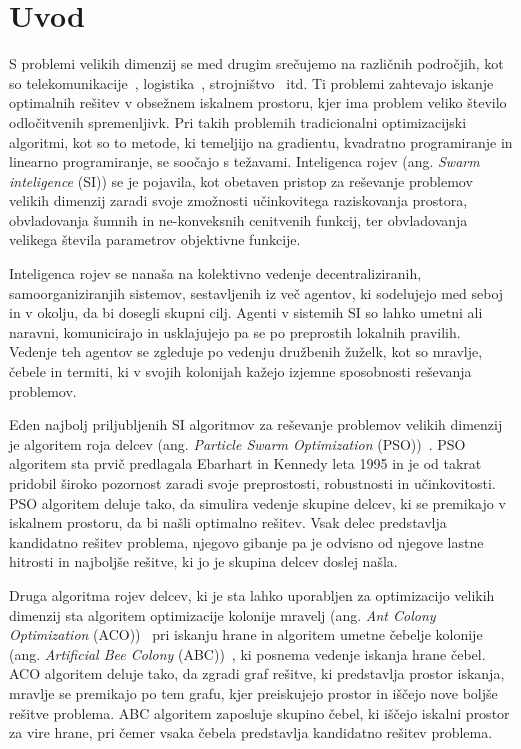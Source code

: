 \chapter{Uvod}\label{cahp:uvod}
S problemi velikih dimenzij se med drugim srečujemo na različnih področjih, kot so telekomunikacije~\cite{bib:lsgo:telecommunication}, logistika~\cite{bib:lsog:logistics}, strojništvo~\cite{bib:lsgo:engineering} itd.
Ti problemi zahtevajo iskanje optimalnih rešitev v obsežnem iskalnem prostoru, kjer ima problem veliko število odločitvenih spremenljivk.
Pri takih problemih tradicionalni optimizacijski algoritmi, kot so to metode, ki temeljijo na gradientu, kvadratno programiranje in linearno programiranje, se soočajo s težavami.
Inteligenca rojev (ang. \textit{Swarm inteligence} (SI)) se je pojavila, kot obetaven pristop za reševanje problemov velikih dimenzij zaradi svoje zmožnosti učinkovitega raziskovanja prostora, obvladovanja šumnih in ne-konveksnih cenitvenih funkcij, ter obvladovanja velikega števila parametrov objektivne funkcije.

Inteligenca rojev se nanaša na kolektivno vedenje decentraliziranih, samoorganiziranjih sistemov, sestavljenih iz več agentov, ki sodelujejo med seboj in v okolju, da bi dosegli skupni cilj.
Agenti v sistemih SI so lahko umetni ali naravni, komunicirajo in usklajujejo pa se po preprostih lokalnih pravilih.
Vedenje teh agentov se zgleduje po vedenju družbenih žuželk, kot so mravlje, čebele in termiti, ki v svojih kolonijah kažejo izjemne sposobnosti reševanja problemov.

Eden najbolj priljubljenih SI algoritmov za reševanje problemov velikih dimenzij je algoritem roja delcev (ang. \textit{Particle Swarm Optimization} (PSO))~\cite{alg:pso}.
PSO algoritem sta prvič predlagala Ebarhart in Kennedy leta 1995 in je od takrat pridobil široko pozornost zaradi svoje preprostosti, robustnosti in učinkovitosti.
PSO algoritem deluje tako, da simulira vedenje skupine delcev, ki se premikajo v iskalnem prostoru, da bi našli optimalno rešitev.
Vsak delec predstavlja kandidatno rešitev problema, njegovo gibanje pa je odvisno od njegove lastne hitrosti in najboljše rešitve, ki jo je skupina delcev doslej našla.

Druga algoritma rojev delcev, ki je sta lahko uporabljen za optimizacijo velikih dimenzij sta algoritem optimizacije kolonije mravelj (ang. \textit{Ant Colony Optimization} (ACO))~\cite{alg:aco} pri iskanju hrane in algoritem umetne čebelje kolonije (ang. \textit{Artificial Bee Colony} (ABC))~\cite{alg:abc}, ki posnema vedenje iskanja hrane čebel.
ACO algoritem deluje tako, da zgradi graf rešitve, ki predstavlja prostor iskanja, mravlje se premikajo po tem grafu, kjer preiskujejo prostor in iščejo nove boljše rešitve problema.
ABC algoritem zaposluje skupino čebel, ki iščejo iskalni prostor za vire hrane, pri čemer vsaka čebela predstavlja kandidatno rešitev problema.

